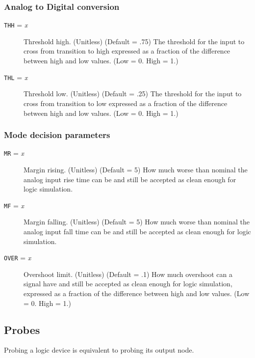 \subsubsection{Analog to Digital conversion}
\begin{description}

\item[{\tt THH} = {\it x}] Threshold high.  (Unitless) (Default = .75) The
threshold for the input to cross from transition to high expressed as a
fraction of the difference between high and low values.  (Low = 0.  High =
1.)

\item[{\tt THL} = {\it x}] Threshold low.  (Unitless) (Default = .25) The
threshold for the input to cross from transition to low expressed as a
fraction of the difference between high and low values.  (Low = 0.  High =
1.)

\end{description}
\subsubsection{Mode decision parameters}
\begin{description}

\item[{\tt MR} = {\it x}] Margin rising.  (Unitless) (Default = 5) How much
worse than nominal the analog input rise time can be and still be accepted
as clean enough for logic simulation.

\item[{\tt MF} = {\it x}] Margin falling.  (Unitless) (Default = 5) How much
worse than nominal the analog input fall time can be and still be accepted
as clean enough for logic simulation.

\item[{\tt OVER} = {\it x}] Overshoot limit.  (Unitless) (Default = .1) How
much overshoot can a signal have and still be accepted as clean enough for
logic simulation, expressed as a fraction of the difference between high and
low values.  (Low = 0.  High = 1.)

\end{description}
\subsection{Probes}

Probing a logic device is equivalent to probing its output node.

